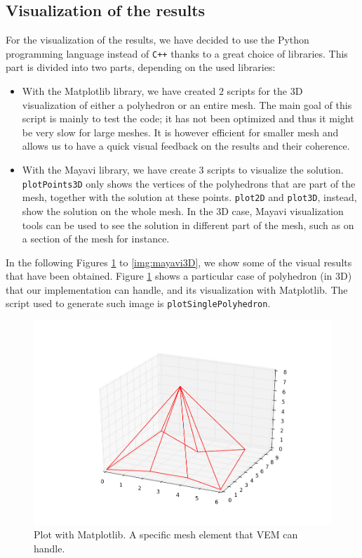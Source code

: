 \subsection{Visualization of the results}
For the visualization of the results, we have decided to use the Python programming language instead of \verb!C++! thanks to a great choice of libraries. This part is divided into two parts, depending on the used libraries:
\begin{itemize}
\item With the Matplotlib library, we have created $2$ scripts for the $3$D visualization of either a polyhedron or an entire mesh. The main goal of this script is mainly to test the code; it has not been optimized and thus it might be very slow for large meshes. It is however efficient for smaller mesh and allows us to have a quick visual feedback on the results and their coherence. 
\item With the Mayavi library, we have create $3$ scripts to visualize the solution. \verb|plotPoints3D| only shows the vertices of the polyhedrons that are part of the mesh, together with the solution at these points. \verb|plot2D| and \verb|plot3D|, instead, show the solution on the whole mesh. In the $3$D case, Mayavi visualization tools can be used to see the solution in different part of the mesh, such as on a section of the mesh for instance. 
\end{itemize}

In the following Figures \ref{img:geom} to \ref{img:mayavi3D}, we show some of the visual results that have been obtained. Figure \ref{img:geom} shows a particular case of polyhedron (in $3$D) that our implementation can handle, and its visualization with Matplotlib. The script used to generate such image is \verb|plotSinglePolyhedron|. 

\begin{figure}[!h]
\centering
\includegraphics[scale=0.4]{images/matplotlibTest5.png}
\caption{Plot with Matplotlib. A specific mesh element that VEM can handle.}\label{img:geom}
\end{figure}

